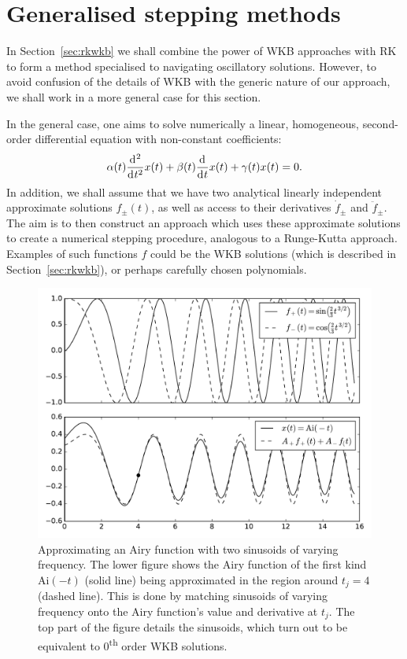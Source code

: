 \section{Generalised stepping methods}
\label{sec:stepping_methods}
In Section~\ref{sec:rkwkb} we shall combine the power of WKB approaches with RK to form a method specialised to navigating oscillatory solutions. However, to avoid confusion of the details of WKB with the generic nature of our approach, we shall work in a more general case for this section.

In the general case, one aims to solve numerically a linear, homogeneous, second-order differential equation with non-constant coefficients:
\begin{equation}
    \alpha(t) \frac{\operatorname{d}^{}\!{}^2}{\operatorname{d}^{}\!{t}^2}x(t) + \beta(t) \frac{\operatorname{d}^{}\!{}}{\operatorname{d}^{}\!{t}}x(t) + \gamma(t) x(t) = 0.
    \label{eqn:general_second_order}
\end{equation}
In addition, we shall assume that we have two analytical linearly independent approximate solutions \(f_\pm(t)\), as well as access to their derivatives \(\dot{f}_\pm\) and \(\ddot{f}_\pm\). The aim is to then construct an approach which uses these approximate solutions to create a numerical stepping procedure, analogous to a Runge-Kutta approach. Examples of such functions $f$ could be the WKB solutions (which is described in Section~\ref{sec:rkwkb}), or perhaps carefully chosen polynomials.

\begin{figure}
  \includegraphics[width=\textwidth]{chapters/RKWKB/figures/matching}
  \caption{Approximating an Airy function with two sinusoids of varying frequency. The lower figure shows the Airy function of the first kind \(\mathrm{Ai}(-t)\) (solid line) being approximated in the region around \(t_j=4\) (dashed line). This is done by matching sinusoids of varying frequency onto the Airy function's value and derivative at \(t_j\). The top part of the figure details the sinusoids, which turn out to be equivalent to 0\textsuperscript{th} order WKB solutions.}\label{fig:matching}
\end{figure}

